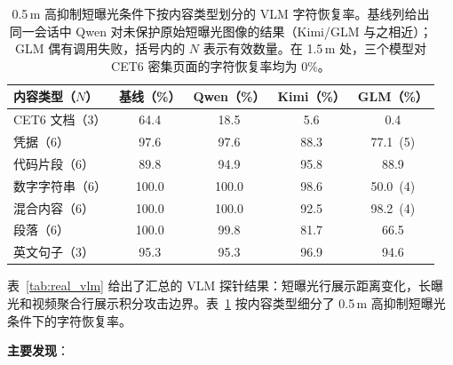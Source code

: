 \documentclass{ieeeaccess}
\begin{document}
\begin{table}[!t]
\caption{0.5\,m 高抑制短曝光条件下按内容类型划分的 VLM 字符恢复率。基线列给出同一会话中 Qwen 对未保护原始短曝光图像的结果（Kimi/GLM 与之相近）；GLM 偶有调用失败，括号内的 $N$ 表示有效数量。在 1.5\,m 处，三个模型对 CET6 密集页面的字符恢复率均为 0\%。}
\label{tab:vlm_content}
\centering
\footnotesize
\setlength{\tabcolsep}{2.8pt}
\begin{tabular}{lcccc}
\toprule
内容类型（$N$） & 基线（\%） & Qwen（\%） & Kimi（\%） & GLM（\%） \\
\midrule
CET6 文档（3） & 64.4 & 18.5 & 5.6 & 0.4 \\
凭据（6） & 97.6 & 97.6 & 88.3 & 77.1~(5) \\
代码片段（6） & 89.8 & 94.9 & 95.8 & 88.9 \\
数字字符串（6） & 100.0 & 100.0 & 98.6 & 50.0~(4) \\
混合内容（6） & 100.0 & 100.0 & 92.5 & 98.2~(4) \\
段落（6） & 100.0 & 99.8 & 81.7 & 66.5 \\
英文句子（3） & 95.3 & 95.3 & 96.9 & 94.6 \\
\bottomrule
\end{tabular}
\end{table}

表~\ref{tab:real_vlm} 给出了汇总的 VLM 探针结果：短曝光行展示距离变化，长曝光和视频聚合行展示积分攻击边界。表~\ref{tab:vlm_content} 按内容类型细分了 0.5\,m 高抑制短曝光条件下的字符恢复率。

\textbf{主要发现}：
\end{document}
